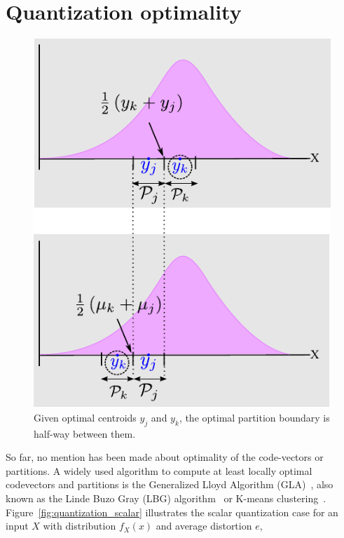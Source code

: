 \section{Quantization optimality}
\label{sec:quantization_optimality}


								\begin{figure}[t]		
								\center	
								\includegraphics[height=0.5\textheight]{thesis/Quantization_optimalPartitions2.pdf}
								\caption{Given optimal centroids $y_j$ and $y_k$, the optimal partition boundary is half-way between them.}
								\label{fig:computing_optimal_partitions}
								\end{figure}

So far, no mention has been made about optimality of the code-vectors or partitions.  A widely used algorithm to compute at least locally optimal codevectors and partitions is the Generalized Lloyd Algorithm (GLA)~\cite{1991_BOOK_VQ_GershoGray}, also known as the Linde Buzo Gray (LBG) algorithm~\cite{1982_JNL_LeastSquaresQuantization_Lloyd} or K-means clustering~\cite{1967_CNF_Kmeans_Macqueen}.  Figure~\ref{fig:quantization_scalar} illustrates the scalar quantization case for an input $X$ with distribution $f_X(x)$ and average distortion $e$, 

